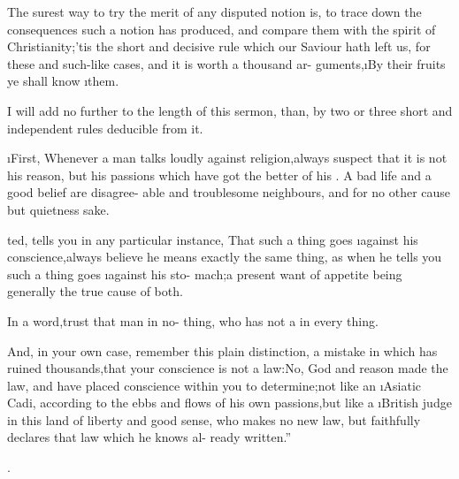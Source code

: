 \documentclass[twoside]{article}
\begin{document}
\lqq The surest way to try the merit of\break
\lqq any disputed notion is, to trace down\break
\lqq the consequences such a notion has\break
\lqq produced, and compare them with the\break
\lqq spirit of Christianity;\tsh ’tis the short\break
\lqq and decisive rule which our Saviour\break
\lqq hath left us, for these and such-like\break
\lqq cases, and it is worth a thousand ar-\break
\lqq guments,\tsk \i{By their fruits ye shall know}\break
\lqq \i{them.} 

\lqq I will add no further to the length\break
\lqq of this sermon, than, by two or three
\lqq short and independent rules deducible\break
\lqq from it.

\lqq \i{First}, Whenever a man talks loudly\break
\lqq against religion,\tsk always suspect that it\break
\lqq is not his reason, but his passions which\break
\lqq have got the better of his . A\break
\lqq bad life and a good belief are disagree-\break
\lqq able and troublesome neighbours, and\break
\lqq {}\break
\lqq for no other cause but quietness sake.

\lqq {}\break
\lqq ted, tells you in any particular instance,\break
\lqq \tsk That such a thing goes \i{against} his\break
\lqq conscience,\tsk always believe he means\break
\lqq exactly the same thing, as when he tells\break
\lqq you such a thing goes \i{against} his sto-\break
\lqq mach;\tsk a present want of appetite\break
\lqq being generally the true cause of both.


\lqq In a word,\tsk trust that man in no-\break
\lqq thing, who has not a  in\break
\lqq every thing.

\lqq And, in your own case, remember\break
\lqq this plain distinction, a mistake in\break
\lqq which has ruined thousands,\tsk that\break
\lqq your conscience is not a law:\tsk No,\break
\lqq God and reason made the law, and\break
\lqq have placed conscience within you to\break
\lqq determine;\tsh not like an \i{Asiatic} Cadi,\break
\lqq according to the ebbs and flows of his\break
\lqq own passions,\tsk but like a \i{British} judge\break
\lqq in this land of liberty and good sense,\break
\lqq who makes no new law, but faithfully\break
\lqq declares that law which he knows al-\break
\lqq ready written.”

\bigskip

\centerline{.}

\noindent{}
\end{document}
